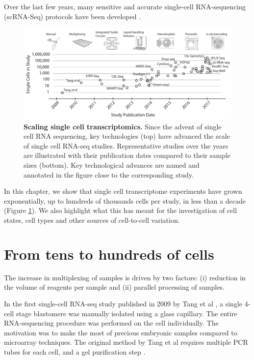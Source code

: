 Over the last few years, many sensitive and accurate single-cell RNA-sequencing
(scRNA-Seq) protocols have been developed \cite{Svensson2017-pf}.

\begin{figure}
    \centering
    \centerline{\includegraphics[width=\textwidth]{"main-figure"}}
    \caption[Scaling single cell transcriptomics]{\textbf{Scaling single cell transcriptomics.} Since the advent of single cell RNA sequencing, key technologies (top) have advanced the scale of single cell RNA-seq studies. Representative studies over the years are illustrated with their publication dates compared to their sample sizes (bottom). Key technological advances are named and annotated in the figure close to the corresponding study.}
    \label{fig:scaling}
\end{figure}

In this chapter, we show that single cell transcriptome experiments have grown exponentially, up to hundreds of thousands cells per study, in less than a decade (Figure \ref{fig:scaling}). We also highlight what this has meant for the investigation of cell states, cell types and other sources of cell-to-cell variation.

\section{From tens to hundreds of cells}

The increase in multiplexing of samples is driven by two factors: (i) reduction in the volume of reagents per sample and (ii) parallel processing of samples.

In the first single-cell RNA-seq study published in 2009 by Tang et al \cite{Tang2009-af}, a single 4-cell stage blastomere was manually isolated using a glass capillary. The entire RNA-sequencing procedure was performed on the cell individually. The motivation was to make the most of precious embryonic samples compared to microarray techniques. The original method by Tang et al requires multiple PCR tubes for each cell, and a gel purification step \cite{Sasagawa2013-ps, Tang2010-am}.

